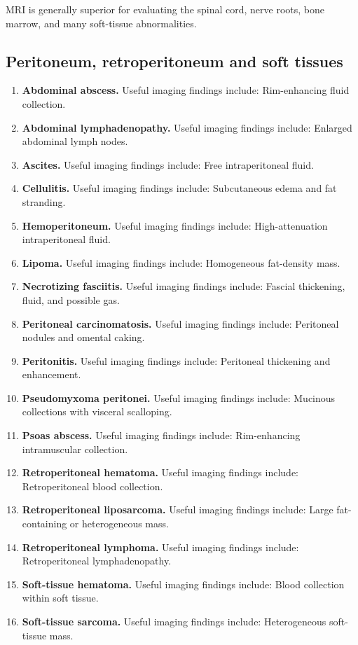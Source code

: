 MRI is generally superior for evaluating the spinal cord, nerve roots, bone marrow, and many soft-tissue abnormalities.

\subsection{Peritoneum, retroperitoneum and soft tissues}
\begin{enumerate}[leftmargin=*,itemsep=0.45em,topsep=0.4em]
\item \textbf{Abdominal abscess.} Useful imaging findings include: Rim-enhancing fluid collection.
\item \textbf{Abdominal lymphadenopathy.} Useful imaging findings include: Enlarged abdominal lymph nodes.
\item \textbf{Ascites.} Useful imaging findings include: Free intraperitoneal fluid.
\item \textbf{Cellulitis.} Useful imaging findings include: Subcutaneous edema and fat stranding.
\item \textbf{Hemoperitoneum.} Useful imaging findings include: High-attenuation intraperitoneal fluid.
\item \textbf{Lipoma.} Useful imaging findings include: Homogeneous fat-density mass.
\item \textbf{Necrotizing fasciitis.} Useful imaging findings include: Fascial thickening, fluid, and possible gas.
\item \textbf{Peritoneal carcinomatosis.} Useful imaging findings include: Peritoneal nodules and omental caking.
\item \textbf{Peritonitis.} Useful imaging findings include: Peritoneal thickening and enhancement.
\item \textbf{Pseudomyxoma peritonei.} Useful imaging findings include: Mucinous collections with visceral scalloping.
\item \textbf{Psoas abscess.} Useful imaging findings include: Rim-enhancing intramuscular collection.
\item \textbf{Retroperitoneal hematoma.} Useful imaging findings include: Retroperitoneal blood collection.
\item \textbf{Retroperitoneal liposarcoma.} Useful imaging findings include: Large fat-containing or heterogeneous mass.
\item \textbf{Retroperitoneal lymphoma.} Useful imaging findings include: Retroperitoneal lymphadenopathy.
\item \textbf{Soft-tissue hematoma.} Useful imaging findings include: Blood collection within soft tissue.
\item \textbf{Soft-tissue sarcoma.} Useful imaging findings include: Heterogeneous soft-tissue mass.
\end{enumerate}

